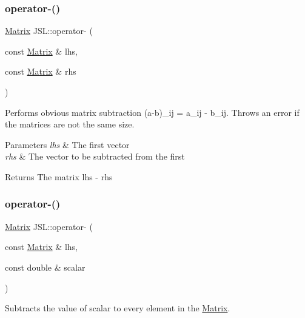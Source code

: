 \subsubsection{\texorpdfstring{operator-\/()}{operator-()}\hspace{0.1cm}{\footnotesize\ttfamily [4/6]}}
{\footnotesize\ttfamily \hyperlink{classJSL_1_1Matrix}{Matrix} J\+S\+L\+::operator-\/ (\begin{DoxyParamCaption}\item[{const \hyperlink{classJSL_1_1Matrix}{Matrix} \&}]{lhs,  }\item[{const \hyperlink{classJSL_1_1Matrix}{Matrix} \&}]{rhs }\end{DoxyParamCaption})\hspace{0.3cm}{\ttfamily [inline]}}



Performs obvious matrix subtraction (a-\/b)\+\_\+ij = a\+\_\+ij -\/ b\+\_\+ij. Throws an error if the matrices are not the same size. 


\begin{DoxyParams}{Parameters}
{\em lhs} & The first vector \\
\hline
{\em rhs} & The vector to be subtracted from the first \\
\hline
\end{DoxyParams}
\begin{DoxyReturn}{Returns}
The matrix lhs -\/ rhs 
\end{DoxyReturn}
\mbox{\label{namespaceJSL_a6d5304adbdadcb062246266f4ece24a1}} 
\subsubsection{\texorpdfstring{operator-\/()}{operator-()}\hspace{0.1cm}{\footnotesize\ttfamily [5/6]}}
{\footnotesize\ttfamily \hyperlink{classJSL_1_1Matrix}{Matrix} J\+S\+L\+::operator-\/ (\begin{DoxyParamCaption}\item[{const \hyperlink{classJSL_1_1Matrix}{Matrix} \&}]{lhs,  }\item[{const double \&}]{scalar }\end{DoxyParamCaption})\hspace{0.3cm}{\ttfamily [inline]}}



Subtracts the value of scalar to every element in the \hyperlink{classJSL_1_1Matrix}{Matrix}. 


